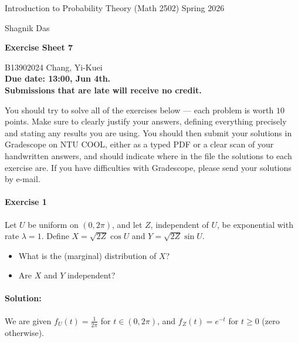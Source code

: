 \documentclass[a4paper,12pt]{article}
\newcommand{\courseTitle}{Introduction to Probability Theory (Math 2502)}
\newcommand{\semester}{Spring 2026}
\newcommand{\instructorA}{Shagnik Das}
\newcommand{\instructorB}{}
\newcommand{\sheetNumber}{7}
\newcommand{\dueDate}{13:00, Jun 4th.}
\newcommand{\lateWarning}{Submissions that are late will receive no credit.}
\newcommand{\buildtitle}[4]{
\begin{flushleft}
{\large
#1
\hfill{}
#2
\par
#3
}
\end{flushleft}
\vskip 4pt
\begin{center}
{\large\bfseries#4\par}
\end{center}
\bigskip
}
\begin{document}
\buildtitle{\courseTitle{}}{\semester}{\instructorA{} \hfill \instructorB{}}{Exercise Sheet \sheetNumber{}}

\vspace{-0.2in}

\begin{center}

{B13902024 Chang, Yi-Kuei \\ \bf Due date: \dueDate \\ \lateWarning}

\end{center}

\noindent You should try to solve all of the exercises below --- each problem is worth $10$ points. Make sure to clearly justify your answers, defining everything precisely and stating any results you are using. You should then submit your solutions in Gradescope on NTU COOL, either as a typed PDF or a clear scan of your handwritten answers, and should indicate where in the file the solutions to each exercise are. If you have difficulties with Gradescope, please send your solutions by e-mail.

\paragraph{Exercise 1} Let $U$ be uniform on $(0,2\pi)$, and let $Z$, independent of $U$, be exponential with rate $\lambda = 1$. Define $X = \sqrt{2Z} \cos U$ and $Y = \sqrt{2Z} \sin U$. 
\begin{itemize}
	\item[(a)] What is the (marginal) distribution of $X$?
	\item[(b)] Are $X$ and $Y$ independent?
\end{itemize}

\paragraph{Solution:}

We are given $f_U(t) = \frac{1}{2\pi}$ for $t \in (0, 2\pi)$, and $f_Z(t) = e^{-t}$ for $t \geq 0$ (zero otherwise).
\end{document}
